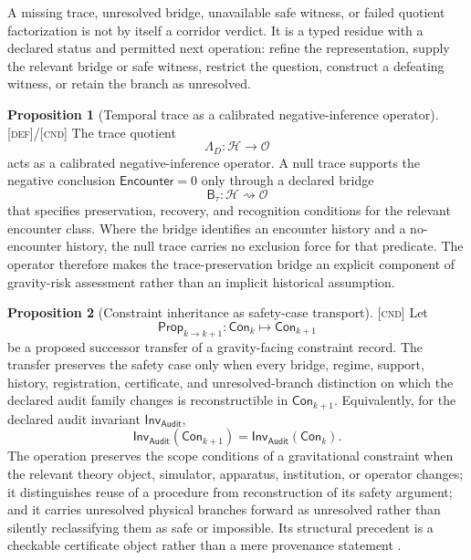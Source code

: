 \documentclass[11pt]{article}
\newcommand{\Audit}{\ensuremath{\mathsf{Audit}}}
\newcommand{\Defn}{\textsc{[def]}}
\newcommand{\Cnd}{\textsc{[cnd]}}
\theoremstyle{definition}
\newtheorem{sproposition}{Proposition}
\begin{document}
A missing trace, unresolved bridge, unavailable safe witness, or failed quotient
factorization is not by itself a corridor verdict. It is a typed residue with a
declared status and permitted next operation: refine the representation, supply
the relevant bridge or safe witness, restrict the question, construct a defeating
witness, or retain the branch as unresolved.

\begin{sproposition}[Temporal trace as a calibrated negative-inference operator]
\label{prop:trace-calibration}
\Defn{}/\Cnd{} The trace quotient
\begin{equation}
\Lambda_D:\mathcal H\longrightarrow\mathcal O
\end{equation}
acts as a calibrated negative-inference operator. A null trace supports the
negative conclusion $\mathsf{Encounter}=0$ only through a declared bridge
\begin{equation}
\mathsf B_{\tau}:
\mathcal H\rightsquigarrow\mathcal O
\end{equation}
that specifies preservation, recovery, and recognition conditions for the relevant
encounter class. Where the bridge identifies an encounter history and a
no-encounter history, the null trace carries no exclusion force for that predicate.
The operator therefore makes the trace-preservation bridge an explicit component of
gravity-risk assessment rather than an implicit historical assumption.
\end{sproposition}

\begin{sproposition}[Constraint inheritance as safety-case transport]
\label{prop:inheritance-transport}
\Cnd{} Let
\begin{equation}
\mathsf{Prop}_{k\to k+1}:
\mathsf{Con}_{k}\longmapsto\mathsf{Con}_{k+1}
\end{equation}
be a proposed successor transfer of a gravity-facing constraint record. The
transfer preserves the safety case only when every bridge, regime, support,
history, registration, certificate, and unresolved-branch distinction on which the
declared audit family changes is reconstructible in $\mathsf{Con}_{k+1}$. Equivalently,
for the declared audit invariant $\mathsf{Inv}_{\Audit}$,
\begin{equation}
\mathsf{Inv}_{\Audit}(\mathsf{Con}_{k+1})
=
\mathsf{Inv}_{\Audit}(\mathsf{Con}_{k}).
\label{eq:inheritance-invariant}
\end{equation}
The operation preserves the scope conditions of a gravitational constraint when the
relevant theory object, simulator, apparatus, institution, or operator changes; it
distinguishes reuse of a procedure from reconstruction of its safety argument; and
it carries unresolved physical branches forward as unresolved rather than silently
reclassifying them as safe or impossible. Its structural precedent is a checkable
certificate object rather than a mere provenance statement
\cite{S_Necula1997,S_MoreauEtAl2013}.
\end{sproposition}
\end{document}
